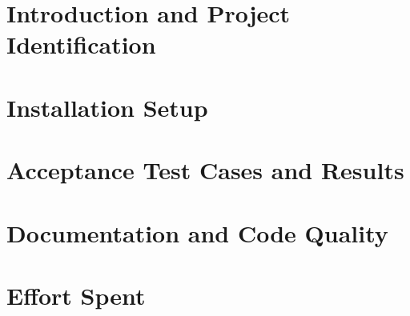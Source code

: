 \documentclass[a4paper,11pt]{report}
\begin{document}
\clearpage
\chapter{{Introduction and Project Identification}}
\label{sect:introduction}


\clearpage
\chapter{{Installation Setup}}
\label{sect:in}


\clearpage
\chapter{{Acceptance Test Cases and Results}}
\label{sect:acceptance_test_cases}


\clearpage
\chapter{{Documentation and Code Quality}}
\label{sect:documentation_code_quality}


\clearpage
\chapter{Effort Spent}
\label{sect:effort}

\end{document}

